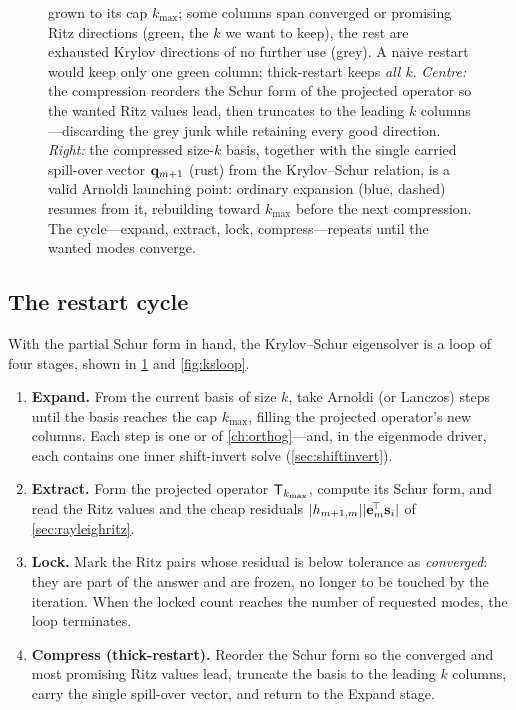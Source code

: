 \begin{figure}[t]
{grown to its cap $k_{\max}$; some columns span converged or promising Ritz directions (green,
the $k$ we want to keep), the rest are exhausted Krylov directions of no further use (grey).
A naive restart would keep only one green column; thick-restart keeps \emph{all $k$}.
\emph{Centre:} the compression reorders the Schur form of the projected operator so the wanted
Ritz values lead, then truncates to the leading $k$ columns---discarding the grey junk while
retaining every good direction. \emph{Right:} the compressed size-$k$ basis, together with the
single carried spill-over vector $\mathbf{q}_{m+1}$ (rust) from the Krylov--Schur relation, is a valid
Arnoldi launching point: ordinary expansion (blue, dashed) resumes from it, rebuilding toward
$k_{\max}$ before the next compression. The cycle---expand, extract, lock, compress---repeats
until the wanted modes converge.}
\label{fig:thickrestart}
\end{figure}

\subsection{The restart cycle}

With the partial Schur form in hand, the Krylov--Schur eigensolver is a loop of four stages,
shown in \cref{fig:thickrestart} and \cref{fig:ksloop}.

\begin{enumerate}
  \item \textbf{Expand.} From the current basis of size $k$, take Arnoldi (or Lanczos) steps
  until the basis reaches the cap $k_{\max}$, filling the projected operator's new columns. Each
  step is one  or  of \cref{ch:orthog}---and, in the
  eigenmode driver, each contains one inner shift-invert solve (\cref{sec:shiftinvert}).
  \item \textbf{Extract.} Form the projected operator $\mathsf{T}_{k_{\max}}$, compute its Schur
  form, and read the Ritz values and the cheap residuals $\lvert h_{m+1,m}\rvert\lvert\mathbf{e}_m^{\!\top}\mathbf{s}_i\rvert$
  of \cref{sec:rayleighritz}.
  \item \textbf{Lock.} Mark the Ritz pairs whose residual is below tolerance as
  \emph{converged}: they are part of the answer and are frozen, no longer to be touched by the
  iteration. When the locked count reaches the number of requested modes, the loop terminates.
  \item \textbf{Compress (thick-restart).} Reorder the Schur form so the converged and most
  promising Ritz values lead, truncate the basis to the leading $k$ columns, carry the single
  spill-over vector, and return to the Expand stage.
\end{enumerate}

